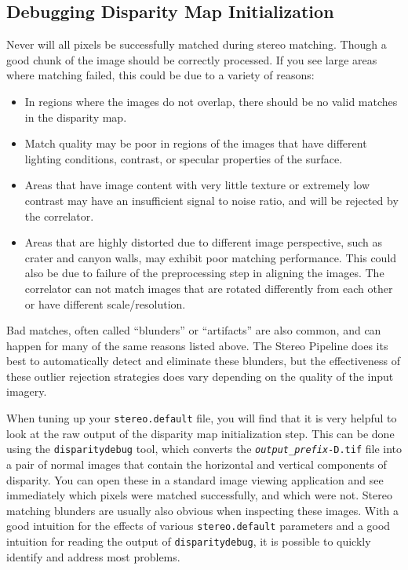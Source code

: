 \subsection{Debugging Disparity Map Initialization}

Never will all pixels be successfully matched during stereo
matching. Though a good chunk of the image should be correctly
processed. If you see large areas where matching failed, this could be
due to a variety of reasons:

\begin{itemize}
\item In regions where the images do not overlap, there should be no
  valid matches in the disparity map.
\item Match quality may be poor in regions of the images that have
  different lighting conditions, contrast, or specular properties of
  the surface.
\item Areas that have image content with very little texture or
  extremely low contrast may have an insufficient signal to noise
  ratio, and will be rejected by the correlator.
\item Areas that are highly distorted due to different image
  perspective, such as crater and canyon walls, may exhibit poor
  matching performance. This could also be due to failure of the
  preprocessing step in aligning the images. The correlator can not
  match images that are rotated differently from each other or have
  different scale/resolution.
\end{itemize}

Bad matches, often called ``blunders'' or ``artifacts'' are also
common, and can happen for many of the same reasons listed above.  The
Stereo Pipeline does its best to automatically detect and eliminate
these blunders, but the effectiveness of these outlier rejection
strategies does vary depending on the quality of the input imagery.

When tuning up your {\tt stereo.default} file, you will find that
it is very helpful to look at the raw output of the disparity map
initialization step.  This can be done using the {\tt disparitydebug}
tool, which converts the \texttt{\textit{output\_prefix}-D.tif}
file into a pair of normal images that contain the horizontal and
vertical components of disparity.  You can open these in a standard
image viewing application and see immediately which pixels were
matched successfully, and which were not. Stereo matching blunders
are usually also obvious when inspecting these images.  With a good
intuition for the effects of various {\tt stereo.default} parameters
and a good intuition for reading the output of {\tt disparitydebug},
it is possible to quickly identify and address most problems.

